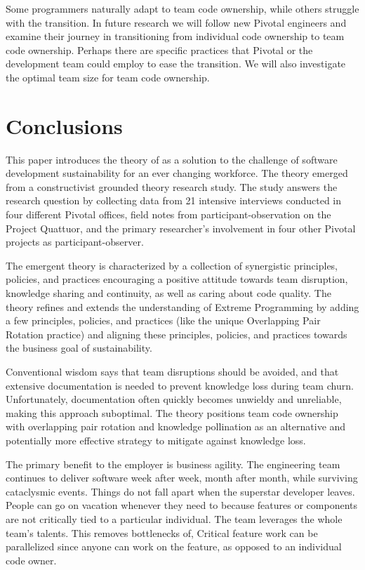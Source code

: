 Some programmers naturally adapt to team code ownership, while others struggle with the transition. In future research we will follow new Pivotal engineers and examine their journey in transitioning from individual code ownership to team code ownership. Perhaps there are 
specific practices that Pivotal or the development team could employ to ease the transition. We will also investigate the optimal team size for team code ownership. 

\section{Conclusions}
This paper introduces the theory of  as a solution to the challenge of software development sustainability for an ever changing workforce. The theory emerged from a constructivist grounded theory research study. The study answers the research  question  by collecting data from 21 intensive interviews conducted in four different Pivotal offices, field notes from participant-observation on the Project Quattuor, and the primary researcher's involvement in four other Pivotal projects as participant-observer.

The emergent theory is characterized by a collection of synergistic principles, policies, and practices encouraging a positive attitude towards team disruption, knowledge sharing and continuity, as well as caring about code quality. The theory refines and extends the understanding of Extreme Programming by adding a few principles, policies, and practices (like the unique Overlapping Pair Rotation practice) and aligning these principles, policies, and practices towards the business goal of sustainability.

Conventional wisdom says that team disruptions should be avoided, and that extensive documentation is needed to prevent knowledge loss during team churn. Unfortunately, documentation often quickly becomes unwieldy and unreliable, making this approach suboptimal. The theory positions team code ownership with overlapping pair rotation and knowledge pollination as an alternative and potentially more effective strategy to mitigate against knowledge loss.

The primary benefit to the employer is business agility. The engineering team continues to deliver software week after week, month after month, while surviving cataclysmic events. Things do not fall apart when the superstar developer leaves. People can go on vacation whenever they need to because features or components are not critically tied to a particular individual. The team leverages the whole team's talents. This removes bottlenecks of,  Critical feature work can be parallelized since anyone can work on the feature, as opposed to an individual code owner. 

